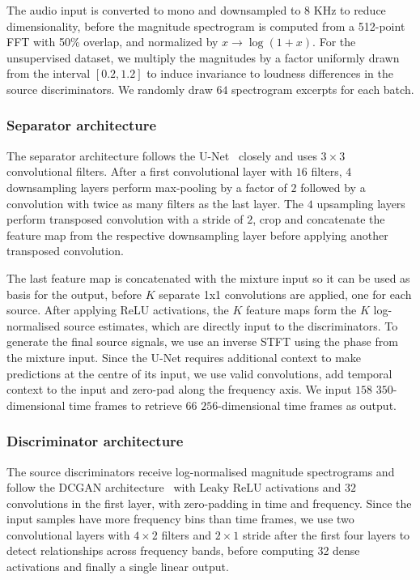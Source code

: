 \documentclass{article}
\begin{document}
The audio input is converted to mono and downsampled to $8$ KHz to reduce dimensionality, before the magnitude spectrogram is computed from a 512-point FFT with 50\% overlap, and normalized by ${x \rightarrow }\log(1+x)$.
For the unsupervised dataset, we multiply the magnitudes by a factor uniformly drawn from the interval $[0.2, 1.2]$ to induce invariance to loudness differences in the source discriminators.
We randomly draw $64$ spectrogram excerpts for each batch.

\subsubsection{Separator architecture}
The separator architecture follows the U-Net~\cite{Ronneberger2015,Jansson2017} closely and uses $3 \times 3$ convolutional filters.
After a first convolutional layer with $16$ filters, $4$ downsampling layers perform max-pooling by a factor of $2$ followed by a convolution with twice as many filters as the last layer.
The $4$ upsampling layers perform transposed convolution with a stride of $2$, crop and concatenate the feature map from the respective downsampling layer before applying another transposed convolution.

The last feature map is concatenated with the mixture input so it can be used as basis for the output, before $K$ separate 1x1 convolutions are applied, one for each source.
After applying ReLU activations, the $K$ feature maps form the $K$ log-normalised source estimates, which are directly input to the discriminators.
To generate the final source signals, we use an inverse STFT using the phase from the mixture input.
Since the U-Net requires additional context to make predictions at the centre of its input, we use valid convolutions, add temporal context to the input and zero-pad along the frequency axis. We input $158$ $350$-dimensional time frames to retrieve $66$ $256$-dimensional time frames as output.

\subsubsection{Discriminator architecture}
The source discriminators receive log-normalised magnitude spectrograms and follow the DCGAN architecture~\cite{Radford2015} with Leaky ReLU activations and $32$ convolutions in the first layer, with zero-padding in time and frequency. 
Since the input samples have more frequency bins than time frames, we use two convolutional layers with $4 \times 2$ filters and $2 \times 1$ stride after the first four layers to detect relationships across frequency bands, before computing 32 dense activations and finally a single linear output.
\end{document}
